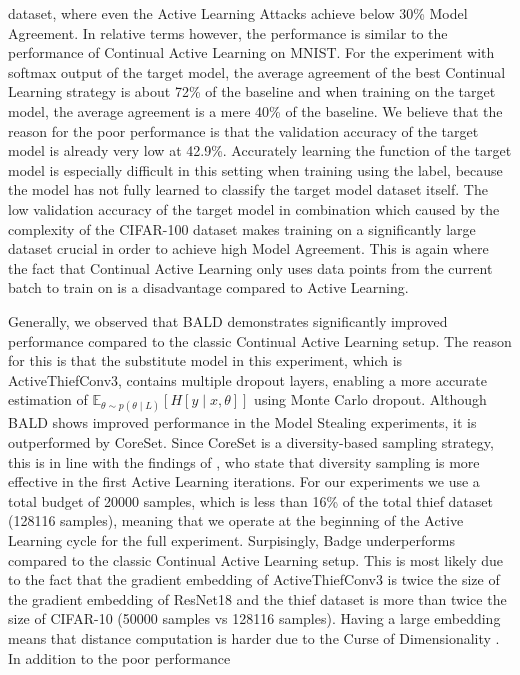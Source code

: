 dataset, where even the Active Learning Attacks achieve below 30\% Model Agreement. In relative terms however, the performance is similar to the performance of Continual Active Learning on MNIST. For the experiment with softmax output of the target model, the average agreement of the
best Continual Learning strategy is about 72\% of the baseline and when training on the target model, the average agreement is a mere 40\% of the baseline. We believe that the reason for the poor performance is that the validation accuracy of the target model is already very low at 42.9\%.
Accurately learning the function of the target model is especially difficult in this setting when training using the label, because the model has not fully learned to classify the target model dataset itself. The low validation accuracy of the target model in combination which caused by
the complexity of the CIFAR-100 dataset makes training on a significantly large dataset crucial in order to achieve high Model Agreement. This is again where the fact that Continual Active Learning only uses data points from the current batch to train on is a disadvantage compared to
Active Learning. \par
Generally, we observed that BALD demonstrates significantly improved performance compared to the classic Continual Active Learning setup. The reason for this is that the substitute model in this experiment, which is ActiveThiefConv3, contains multiple dropout layers, enabling a more
accurate estimation of $\mathbb{E}_{\theta \sim p(\theta \mid L)} [H[y \mid x, \theta]]$ using Monte Carlo dropout. Although BALD shows improved performance in the Model Stealing experiments, it is outperformed by CoreSet. Since CoreSet is a diversity-based sampling strategy, this is
in line with the findings of \cite{ash2019deep}, who state that diversity sampling is more effective in the first Active Learning iterations. For our experiments we use a total budget of 20000 samples, which is less than 16\% of the total thief dataset (128116 samples), meaning that we
operate at the beginning of the Active Learning cycle for the full experiment. Surpisingly, Badge underperforms compared to the classic Continual Active Learning setup. This is most likely due to the fact that the gradient embedding of ActiveThiefConv3 is twice the size of the
gradient embedding of ResNet18 and the thief dataset is more than twice the size of CIFAR-10 (50000 samples vs 128116 samples). Having a large embedding means that distance computation is harder due to the Curse of Dimensionality \cite{koppen2000curse}. In addition to the poor performance
